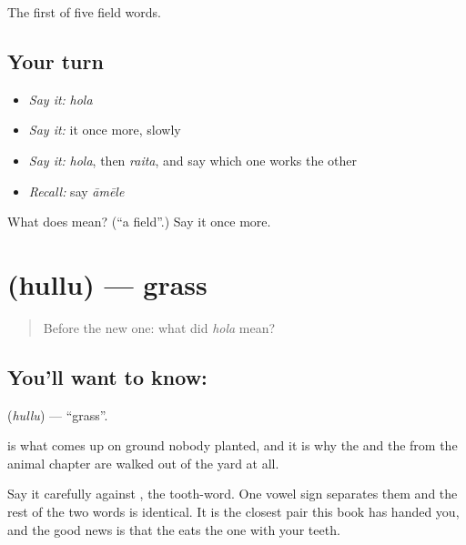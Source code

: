 \begin{grammarlens}[title={What you've built}]
The first of five field words.
\end{grammarlens}

\subsection*{Your turn}
\begin{itemize}
\raggedright
  \item \emph{Say it:} \emph{hola}
  \item \emph{Say it:} it once more, slowly
  \item \emph{Say it:} \emph{hola}, then \emph{raita}, and say which one works the other
  \item \emph{Recall:} say \emph{āmēle}
\end{itemize}

\begin{tcolorbox}[breakable,colback=teal!4,colframe=teal!35!black,title={Before you move on}]
What does  mean? (\textquotedblleft{}a field\textquotedblright{}.) Say it once more.
\end{tcolorbox}
\section[\texorpdfstring{\kn{ಹುಲ್ಲು} (hullu)}{ಹುಲ್ಲು (hullu)}]{ (hullu) — grass}

\label{lesson:KA-C66-grass}



\begin{quote}
Before the new one: what did \emph{hola} mean?
\end{quote}

\subsection*{You'll want to know: }
\textbf{} (\emph{hullu}) — \textquotedblleft{}grass\textquotedblright{}.

 is what comes up on ground nobody planted, and it is why the  and the  from the animal chapter are walked out of the yard at all.

Say it carefully against , the tooth-word. One vowel sign separates them and the rest of the two words is identical. It is the closest pair this book has handed you, and the good news is that the  eats the one with your teeth.

